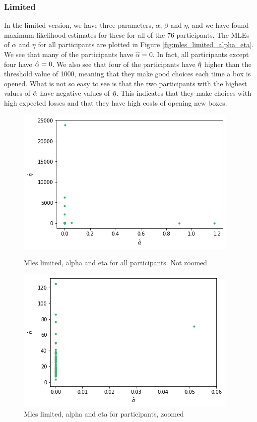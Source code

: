\subsubsection{Limited}
In the limited version, we have three parameters, $\alpha$, $\beta$ and $\eta$, and we have found maximum likelihood estimates for these for all of the 76 participants. The MLEs of $\alpha$ and $\eta$ for all participants are plotted in Figure \ref{fig:mles_limited_alpha_eta}. We see that many of the participants have $\hat{\alpha}=0$. In fact, all participants except four have $\hat{\alpha}=0$. We also see that four of the participants have $\hat{\eta}$ higher than the threshold value of 1000, meaning that they make good choices each time a box is opened. What is not so easy to see is that the two participants with the highest values of $\hat{\alpha}$ have negative values of $\hat{\eta}$. This indicates that they make choices with high expected losses and that they have high costs of opening new boxes. 
\begin{figure}
    \centering
    \begin{minipage}{0.48\textwidth}
        \centering
        \includegraphics[scale=0.38]{pictures/plotted_mles_limited_alpha_eta_gk1.png}
        \caption{Mles limited, alpha and eta for all participants. Not zoomed}
        \label{fig:mles_limited_alpha_eta}
    \end{minipage}\hfill
    \begin{minipage}{0.48\textwidth}
        \centering
        \includegraphics[scale=0.38]{pictures/plotted_mles_limited_alpha_eta_gk1_zoomed.png}
        \caption{Mles limited, alpha and eta for participants, zoomed}
        \label{fig:mles_limited_alpha_eta_zoomed}
    \end{minipage}
\end{figure}

